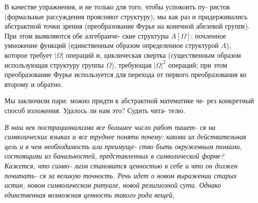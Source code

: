 \documentclass{mai_book}
\begin{document}
\vspace{2pt} В качестве упражнения, и не только для того, чтобы успокоить пу­- \linebreak
ристов (формальные рассуждения проясняют структуру), мы как раз \linebreak
и придерживались абстрактной точки зрения (преобразование Фурье \linebreak
на конечной абелевой группе). При этом выявляются обе алгебраиче­- \linebreak
ские структуры $A[\Omega]$: почленное умножение функций (единственным \linebreak
образом определенное структурой $A$), которое требует $|\Omega|$ операций и, \linebreak
циклическая свертка (существенным образом использующая структуру \linebreak
группы $\Omega$), требующая $|\Omega|^2$ операций; при этом преобразование Фурье \linebreak
используется для перехода от первого преобразования ко второму и \linebreak
обратно. \ 

\vspace{2pt}
Мы заключили пари: можно придти к абстрактной математике че­- \linebreak
рез конкретный способ изложения. Удалось ли нам это? Судить чита­- \linebreak
телю.\ 

\vspace{3pt}\hangindent=29pt
\hspace{28pt} \textit{В наш век пострационализма все большее число работ пишет­- \linebreak
ся на символических языках и все труднее понять почему: какова \linebreak
их действительная цель и в чем необходимость или преимуще­- \linebreak
ство быть окруженным томами, состоящими из банальностей, \linebreak
представленных в символической форме? Кажется, что симво­- \linebreak
лизм становится ценностью в себе и что он должен почитать­- \linebreak
ся за великую точность. Речь идет о новом выражении старых \linebreak
истин, новом символическом ритуале, новой религиозной сути. \linebreak
Однако единственная возможная ценность такого рода вещей,} \linebreak
\end{document}
